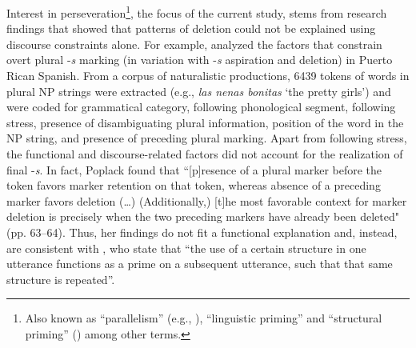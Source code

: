\documentclass[output=paper]{langscibook}
\begin{document}
Interest in perseveration\footnote{Also known as “parallelism” (e.g., \citealt{CarvalhoChild2011}), “linguistic priming” and “structural priming” (\citealt{PickeringFerreira2008}) among other terms.}, the focus of the current study, stems from research findings that showed that patterns of deletion could not be explained using discourse constraints alone.  For example, \citet{Poplack1980} analyzed the factors that constrain overt plural -\textit{s} marking (in variation with -\textit{s} aspiration and deletion) in Puerto Rican Spanish. From a corpus of naturalistic productions, 6439 tokens of words in plural NP strings were extracted (e.g., \textit{las nenas bonitas} ‘the pretty girls’) and were coded for grammatical category, following phonological segment, following stress, presence of disambiguating plural information, position of the word in the NP string, and presence of preceding plural marking. Apart from following stress, the functional and discourse-related factors did not account for the realization of final -\textit{s}. In fact, Poplack found that “[p]resence of a plural marker before the token favors marker retention on that token, whereas absence of a preceding marker favors deletion (…) (Additionally,) [t]he most favorable context for marker deletion is precisely when the two preceding markers have already been deleted" (pp. 63–64). Thus, her findings do not fit a functional explanation and, instead, are consistent with \citet[4]{TorresTravis2010}, who state that “the use of a certain structure in one utterance functions as a prime on a subsequent utterance, such that that same structure is repeated”.
\end{document}
